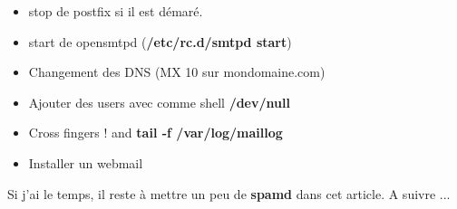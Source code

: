 \documentclass[a4paper,11pt]{article}
\begin{document}
\begin{itemize}
	\item stop de postfix si il est démaré.
	\item start de opensmtpd ({\bf /etc/rc.d/smtpd start})
	\item Changement des DNS (MX 10 sur mondomaine.com)
	\item Ajouter des users avec comme shell {\bf /dev/null}
	\item Cross fingers ! and {\bf tail -f /var/log/maillog}
	\item Installer un webmail
\end{itemize}
\vspace{5mm}
Si j'ai le temps, il reste à mettre un peu de {\bf spamd} dans cet article. A suivre ...
\end{document}
